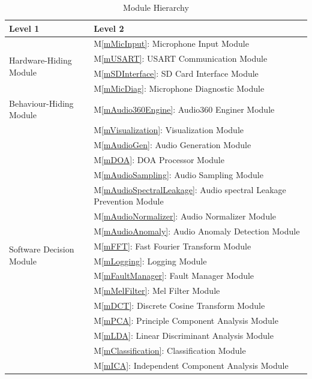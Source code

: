 \documentclass[12pt, titlepage]{article}
\newcommand{\mref}[1]{M\ref{#1}}
\begin{document}
\begin{table}[H]
\centering
\begin{tabular}{p{} p{}}
\toprule
\textbf{Level 1} & \textbf{Level 2}\\
\midrule

\multirow{4}{0.3\textwidth}{Hardware-Hiding Module} 
& \mref{mMicInput}: Microphone Input Module \\ 
& \mref{mUSART}: USART Communication Module \\
& \mref{mSDInterface}: SD Card Interface Module \\
& \mref{mMicDiag}: Microphone Diagnostic Module \\
\midrule

\multirow{1}{0.3\textwidth}{Behaviour-Hiding Module}
& \mref{mAudio360Engine}: Audio360 Enginer Module \\
& \mref{mVisualization}: Visualization Module \\
\midrule

\multirow{16}{0.3\textwidth}{Software Decision Module}
& \mref{mAudioGen}: Audio Generation Module \\
& \mref{mDOA}: DOA Processor Module \\
& \mref{mAudioSampling}: Audio Sampling Module \\
& \mref{mAudioSpectralLeakage}: Audio spectral Leakage Prevention Module \\
& \mref{mAudioNormalizer}: Audio Normalizer Module \\
& \mref{mAudioAnomaly}: Audio Anomaly Detection Module \\
& \mref{mFFT}: Fast Fourier Transform Module \\
& \mref{mLogging}: Logging Module \\
& \mref{mFaultManager}: Fault Manager Module \\
& \mref{mMelFilter}: Mel Filter Module \\
& \mref{mDCT}: Discrete Cosine Transform Module\\
& \mref{mPCA}: Principle Component Analysis Module \\
& \mref{mLDA}: Linear Discriminant Analysis Module \\
& \mref{mClassification}: Classification Module \\
& \mref{mICA}: Independent Component Analysis Module \\
\bottomrule

\end{tabular}
\caption{Module Hierarchy}
\label{TblMH}
\end{table}
\end{document}
